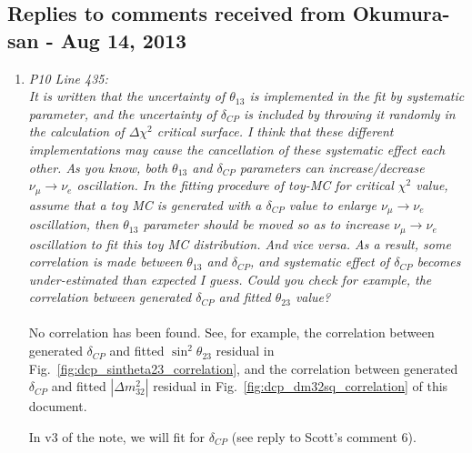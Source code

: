 \subsection{
  Replies to comments received from Okumura-san - Aug 14, 2013 }

\begin{enumerate}

  \vspace{5 mm}
\item
  {\em
    P10 Line 435:\\
    It is written that the uncertainty of $\theta_{13}$ is implemented in the fit by systematic parameter,
    and the uncertainty of $\delta_{CP}$ is included by throwing it randomly in the calculation of $\Delta \chi^2$ critical surface.
    I think that these different implementations may cause the cancellation of these systematic effect each other.
    As you know, both $\theta_{13}$ and $\delta_{CP}$ parameters can increase/decrease $\nu_\mu \rightarrow \nu_e$ oscillation.
    In the fitting procedure of toy-MC for critical $\chi^2$ value, assume that a toy MC is generated with
    a $\delta_{CP}$ value to enlarge $\nu_\mu \rightarrow \nu_e$ oscillation, then $\theta_{13}$ parameter should be moved so as to increase
    $\nu_\mu \rightarrow \nu_e$ oscillation to fit this toy MC distribution. And vice versa. As a result, some correlation is
    made between $\theta_{13}$ and $\delta_{CP}$, and systematic effect of $\delta_{CP}$ becomes under-estimated than expected I guess.
    Could you check for example, the correlation between generated $\delta_{CP}$ and fitted $\theta_{23}$ value?
  }\\
  \\
  No correlation has been found. See, for example,
  the correlation between generated $\delta_{CP}$ and fitted $\sin^2\theta_{23}$ residual
  in Fig.\ \ref{fig:dcp_sintheta23_correlation},
  and the correlation between generated $\delta_{CP}$ and fitted $|\Delta m^2_{32}|$ residual
  in Fig.\ \ref{fig:dcp_dm32sq_correlation} of this document.

  In v3 of the note, we will fit for $\delta_{CP}$ (see reply to Scott's comment 6).


\end{enumerate}
